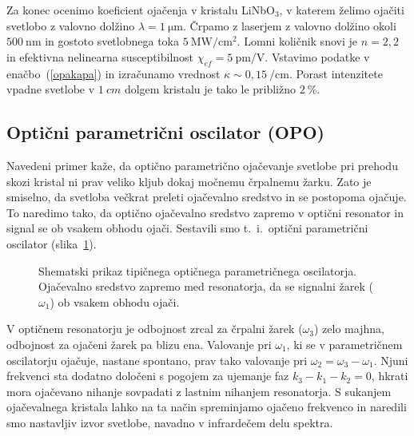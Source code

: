 Za konec ocenimo koeficient ojačenja v kristalu 
LiNbO$_{3}$, v katerem želimo
ojačiti svetlobo z valovno dolžino $\lambda = 1~\si{\micro\metre}$. Črpamo z laserjem z 
valovno dolžino okoli $500~\si{\nano\metre}$ in gostoto svetlobnega 
toka $5~\si{\mega\watt}/\si{\centi\metre}^{2}$. Lomni količnik snovi je 
$n = 2,2$ in efektivna nelinearna susceptibilnost  $\chi_{ef} = 5~\si{\pico\metre}/\si{\volt}$. 
Vstavimo podatke v enačbo~(\ref{opakapa}) in izračunamo vrednost 
$\kappa \sim 0,15~/\si{\centi\metre}$. Porast intenzitete vpadne svetlobe v $1~\si{cm}$ 
dolgem kristalu je tako le približno $2~\%$. 

\subsection*{Optični parametrični oscilator (OPO)}
Navedeni primer kaže, da optično parametrično ojačevanje svetlobe pri prehodu skozi kristal ni prav veliko
kljub dokaj močnemu črpalnemu žarku. Zato je smiselno, da svetloba večkrat preleti
ojačevalno sredstvo in se postopoma ojačuje. To naredimo tako, 
da optično ojačevalno sredstvo zapremo v optični 
resonator
in signal se ob vsakem obhodu ojači. Sestavili smo t.\ i.\ optični parametrični oscilator
(slika~\ref{fig:opo}). 
\begin{figure}[h]
\centering
\def\svgwidth{80truemm} 

\caption{Shematski prikaz tipičnega optičnega parametričnega oscilatorja. Ojačevalno sredstvo
zapremo med resonatorja, da se signalni žarek ($\omega_1$) ob vsakem obhodu ojači.}
\label{fig:opo}
\end{figure}

V optičnem resonatorju je odbojnost zrcal za črpalni žarek ($\omega_3$) zelo majhna, 
odbojnost za ojačeni žarek pa blizu ena. Valovanje pri $\omega_1$,
ki se v parametričnem oscilatorju ojačuje, nastane spontano, prav tako valovanje pri 
$\omega_2 = \omega_3 -\omega_1$. Njuni frekvenci sta dodatno določeni s pogojem za 
ujemanje faz $ k_3 - k_1 - k_2 = 0$, 
hkrati mora ojačevano nihanje sovpadati z lastnim nihanjem resonatorja. 
S sukanjem ojačevalnega kristala lahko na ta način spreminjamo
ojačeno frekvenco in naredili smo nastavljiv izvor svetlobe, navadno v 
infrardečem delu spektra.


